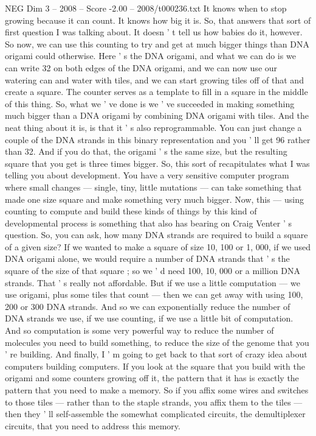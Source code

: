 \begin{textsample}{NEG Dim 3 – 2008 – Score -2.00 – 2008/t000236.txt}
It knows when to stop growing because it can count.
It knows how big it is.
So, that answers that sort of first question I was talking about.
It doesn ' t tell us how babies do it, however.
So now, we can use this counting to try and get at much bigger things than DNA origami could otherwise.
Here ' s the DNA origami, and what we can do is we can write 32 on both edges of the DNA origami, and we can now use our watering can and water with tiles, and we can start growing tiles off of that and create a square.
The counter serves as a template to fill in a square in the middle of this thing.
So, what we ' ve done is we ' ve succeeded in making something much bigger than a DNA origami by combining DNA origami with tiles.
And the neat thing about it is, is that it ' s also reprogrammable.
You can just change a couple of the DNA strands in this binary representation and you ' ll get 96 rather than 32.
And if you do that, the origami ' s the same size, but the resulting square that you get is three times bigger.
So, this sort of recapitulates what I was telling you about development.
You have a very sensitive computer program where small changes — single, tiny, little mutations — can take something that made one size square and make something very much bigger.
Now, this — using counting to compute and build these kinds of things by this kind of developmental process is something that also has bearing on Craig Venter ' s question.
So, you can ask, how many DNA strands are required to build a square of a given size?
If we wanted to make a square of size 10, 100 or 1, 000, if we used DNA origami alone, we would require a number of DNA strands that ' s the square of the size of that square ; so we ' d need 100, 10, 000 or a million DNA strands.
That ' s really not affordable.
But if we use a little computation — we use origami, plus some tiles that count — then we can get away with using 100, 200 or 300 DNA strands.
And so we can exponentially reduce the number of DNA strands we use, if we use counting, if we use a little bit of computation.
And so computation is some very powerful way to reduce the number of molecules you need to build something, to reduce the size of the genome that you ' re building.
And finally, I ' m going to get back to that sort of crazy idea about computers building computers.
If you look at the square that you build with the origami and some counters growing off it, the pattern that it has is exactly the pattern that you need to make a memory.
So if you affix some wires and switches to those tiles — rather than to the staple strands, you affix them to the tiles — then they ' ll self-assemble the somewhat complicated circuits, the demultiplexer circuits, that you need to address this memory.

\end{textsample}
